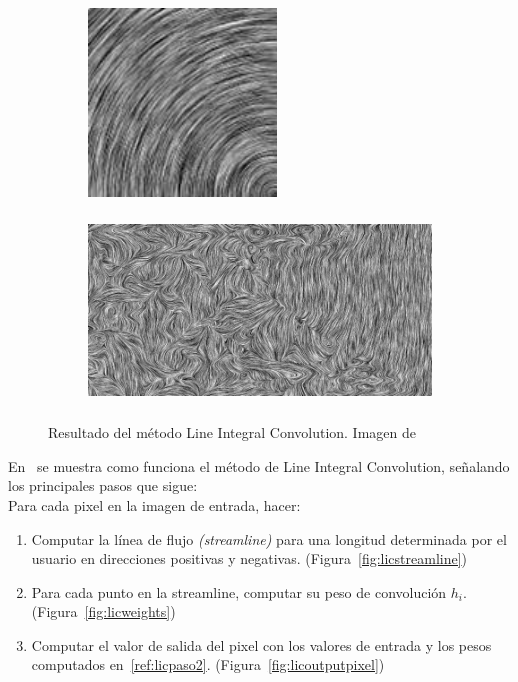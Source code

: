 \begin{figure}[h!]
	\centering	
	\begin{subfigure}{.45\textwidth}
		\includegraphics[height=5cm,width=\textwidth]{figures/lic2.png}
	\end{subfigure}
	\hfill
	\begin{subfigure}{.45\textwidth}
		\includegraphics[height=5cm,width=\textwidth]{figures/lic1.png}
	\end{subfigure}
	\caption{Resultado del método Line Integral Convolution. Imagen
	de~\citet{osti_10185520}}
	\label{fig:lic}
\end{figure}

En~\citet{licthesis} se muestra como funciona el método de Line Integral
Convolution, señalando los principales pasos que sigue:\\

Para cada pixel en la imagen de entrada, hacer:
\begin{enumerate}
		\item Computar la línea de flujo \textit{(streamline)} para una longitud
				determinada por el usuario en direcciones positivas y
				negativas. (Figura~\ref{fig:licstreamline})
		\item \label{ref:licpaso2} Para cada punto en la streamline, computar su
				peso de convolución $h_i$. (Figura~\ref{fig:licweights})
		\item Computar el valor de salida del pixel con los valores de entrada y
				los pesos computados en~\ref{ref:licpaso2}.
				(Figura~\ref{fig:licoutputpixel})
\end{enumerate}

